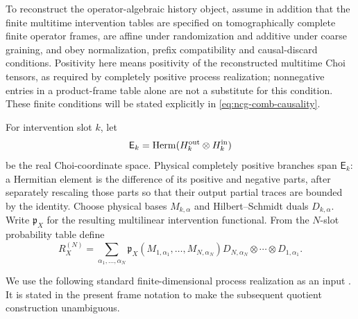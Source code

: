 \documentclass[11pt]{article}
\theoremstyle{definition}
\theoremstyle{remark}
\theoremstyle{definition}
\theoremstyle{remark}
\begin{document}
To reconstruct the operator-algebraic history object, assume in addition that the
finite multitime intervention tables are specified on tomographically complete
finite operator frames, are affine under randomization and additive under coarse
graining, and obey normalization, prefix compatibility and causal-discard
conditions.  Positivity here means positivity of the reconstructed multitime Choi
tensors, as required by completely positive process realization; nonnegative entries
in a product-frame table alone are not a substitute for this condition.  These
finite conditions will be stated explicitly in
\eqref{eq:ncg-comb-causality}.

For intervention slot $k$, let
\[
 \mathsf E_k=\operatorname{Herm}(H_k^{\rm out}\otimes H_k^{\rm in})
\]
be the real Choi-coordinate space.  Physical completely positive branches span
$\mathsf E_k$: a Hermitian element is the difference of its positive and negative
parts, after separately rescaling those parts so that their output partial traces
are bounded by the identity.  Choose physical bases $M_{k,\alpha}$ and
Hilbert--Schmidt duals $D_{k,\alpha}$.  Write $\mathfrak p_X$ for the resulting
multilinear intervention functional.  From the $N$-slot probability table define
\begin{equation}
 R_X^{(N)}
 =\sum_{\alpha_1,\ldots,\alpha_N}
 \mathfrak p_X(M_{1,\alpha_1},\ldots,M_{N,\alpha_N})
 D_{N,\alpha_N}\otimes\cdots\otimes D_{1,\alpha_1}.
 \label{eq:ncg-comb-tomography}
\end{equation}

We use the following standard finite-dimensional process realization as an input
\cite{ChiribellaDArianoPerinotti2009,BisioDArianoPerinottiChiribella2011,PollockEtAl2018}.  It is stated in the present
frame notation to make the subsequent quotient construction unambiguous.
\end{document}
